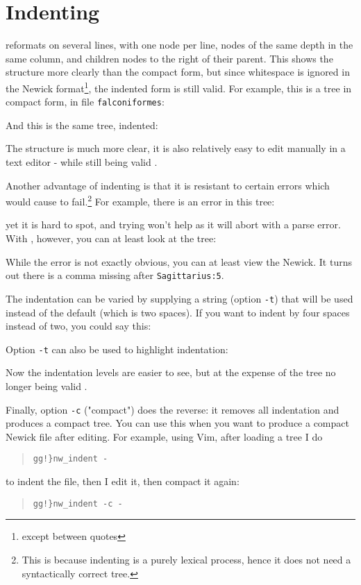 
\section{Indenting}
\label{sct_indent}

\nwindent{} reformats \nw{} on several lines, with one node per line,
nodes of the same depth in the same column, and children nodes to the right of
their parent. This shows the structure more
clearly than the compact form, but since whitespace is ignored in the Newick
format\footnote{except between quotes}, the
indented form is still valid. For example, this is a tree in compact form, in
file \texttt{falconiformes}:

And this is the same tree, indented:
\begin{samepage}


\end{samepage}
The structure is much more clear, it is also relatively easy to edit manually
in a text editor - while still being valid \nw.

Another advantage of indenting is that it is resistant to certain errors
which would cause \display{} to fail.\footnote{This is
because indenting is a purely lexical process, hence it does not need a
syntactically correct tree.} For example, there is an error in this tree:

yet it is hard to spot, and trying \display{} won't help as it will abort with a
parse error. With \nwindent{}, however, you can at least look at the tree:
\begin{samepage}

\end{samepage}
While the error is not exactly obvious, you can at least view the Newick. It turns out there is a comma missing after \texttt{Sagittarius:5}.

The indentation can be varied by supplying a string (option \texttt{-t}) that
will be used instead of the default (which is two spaces). If you want to
indent by four spaces instead of two, you could say this:
\begin{samepage}


\end{samepage}
Option \texttt{-t} can also be used to highlight indentation:
\begin{samepage}


\end{samepage}
Now the indentation levels are easier to see, but at the expense of the tree no
longer being valid \nw.

Finally, option \texttt{-c} ("compact") does the reverse: it removes all
indentation and produces a compact tree. You can use this when you want to
produce a compact Newick file after editing. For example, using Vim, after
loading a \nw{} tree I do 
\begin{quote}
\verb+gg!}nw_indent -+
\end{quote}
to indent the file, then I edit it, then compact it again:
\begin{quote}
\verb+gg!}nw_indent -c -+
\end{quote}
